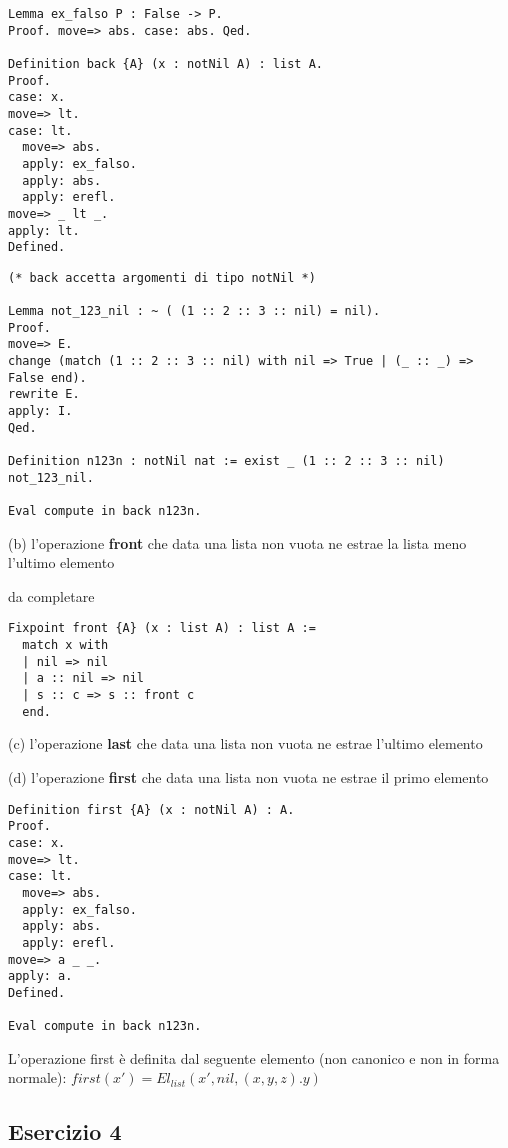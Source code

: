 \begin{lstlisting}[language=Coq]
Lemma ex_falso P : False -> P.
Proof. move=> abs. case: abs. Qed.

Definition back {A} (x : notNil A) : list A.
Proof.
case: x.
move=> lt.
case: lt.
  move=> abs.
  apply: ex_falso.
  apply: abs.
  apply: erefl.
move=> _ lt _.
apply: lt.
Defined.
\end{lstlisting}

\begin{lstlisting}[language=Coq]
(* back accetta argomenti di tipo notNil *)

Lemma not_123_nil : ~ ( (1 :: 2 :: 3 :: nil) = nil).
Proof.
move=> E.
change (match (1 :: 2 :: 3 :: nil) with nil => True | (_ :: _) => False end).
rewrite E.
apply: I.
Qed.

Definition n123n : notNil nat := exist _ (1 :: 2 :: 3 :: nil) not_123_nil.

Eval compute in back n123n.
\end{lstlisting}

(b) l'operazione \textbf{front} che data una lista non vuota ne estrae la lista meno
l'ultimo elemento

da completare

\begin{lstlisting}[language=Coq]
Fixpoint front {A} (x : list A) : list A :=
  match x with
  | nil => nil
  | a :: nil => nil
  | s :: c => s :: front c
  end.
\end{lstlisting}

(c) l'operazione \textbf{last} che data una lista non vuota ne estrae l'ultimo elemento

(d) l'operazione \textbf{first} che data una lista non vuota ne estrae il primo
elemento

\begin{lstlisting}[language=Coq]
Definition first {A} (x : notNil A) : A.
Proof.
case: x.
move=> lt.
case: lt.
  move=> abs.
  apply: ex_falso.
  apply: abs.
  apply: erefl.
move=> a _ _.
apply: a.
Defined.

Eval compute in back n123n.
\end{lstlisting}

L'operazione first è definita dal seguente elemento (non canonico e non in
forma normale): $first(x') = El_{list}(x',nil,(x,y,z).y)$

\subsection{Esercizio 4}

